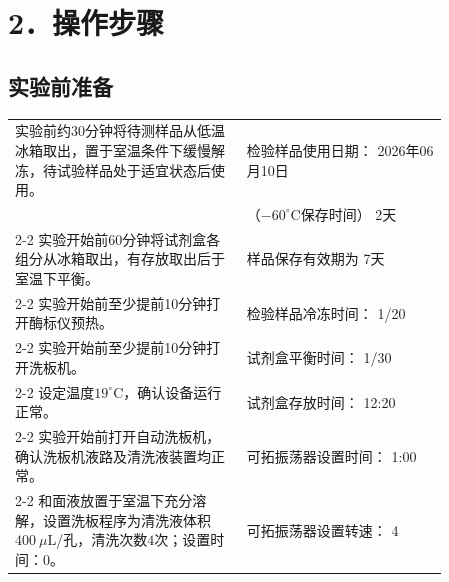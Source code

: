 \documentclass[UTF8,10pt,a4paper,fontset=fandol]{ctexart}
\newcommand{\fieldvalue}[1]{#1}
\newcommand{\handwritten}[1]{#1}
\begin{document}
\section{2．操作步骤}

\subsection{实验前准备}

\begin{tabular}{|p{0.46\linewidth}|p{0.40\linewidth}|}
\hline
实验前约30分钟将待测样品从低温冰箱取出，置于室温条件下缓慢解冻，待试验样品处于适宜状态后使用。 &
检验样品使用日期：
\fieldvalue{\handwritten{2026年06月10日}} \\[-1mm]
&
（$-60^\circ\mathrm{C}$保存时间）
\fieldvalue{\handwritten{2天}} \\
\cline{2-2}
实验开始前60分钟将试剂盒各组分从冰箱取出，有存放取出后于室温下平衡。 &
样品保存有效期为
\fieldvalue{\handwritten{7天}} \\
\cline{2-2}
实验开始前至少提前10分钟打开酶标仪预热。 &
检验样品冷冻时间：
\fieldvalue{\handwritten{1/20}} \\
\cline{2-2}
实验开始前至少提前10分钟打开洗板机。 &
试剂盒平衡时间：
\fieldvalue{\handwritten{1/30}} \\
\cline{2-2}
设定温度$19^\circ\mathrm{C}$，确认设备运行正常。 &
试剂盒存放时间：
\fieldvalue{\handwritten{12:20}} \\
\cline{2-2}
实验开始前打开自动洗板机，确认洗板机液路及清洗液装置均正常。 &
可拓振荡器设置时间：
\fieldvalue{\handwritten{1:00}} \\
\cline{2-2}
和面液放置于室温下充分溶解，设置洗板程序为清洗液体积$400~\mu\mathrm{L}$/孔，清洗次数$4$次；设置时间：$0$。 &
可拓振荡器设置转速：
\fieldvalue{\handwritten{4}} \\

\end{tabular}
\end{document}
